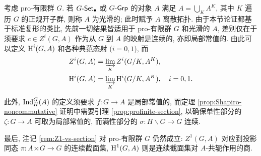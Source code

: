 \begin{remark}\label{rem:pro-finite-coh-nonabelian}
	考虑 pro-有限群 $G$. 若 $G\text{-}\mathsf{Set}_\bullet$ 或 $G\text{-}\mathsf{Grp}$ 的对象 $A$ 满足 $A = \bigcup_K A^K$, 其中 $K$ 遍历 $G$ 的正规开子群, 则称 $A$ 为光滑的; 此时赋予 $A$ 离散拓扑. 由于本节论证都基于标准复形的类比, 先前一切结果皆适用于 pro-有限群 $G$ 和光滑的 $A$, 差别仅在于须要求 $c \in Z^i(G, A)$ 作为从 $G$ 到 $A$ 的映射是连续的, 亦即局部常值的. 由此可以定义 $\operatorname{H}^i(G, A)$ 和各种典范态射 ($i=0,1$), 而
	\begin{align*}
		Z^i(G, A) & = \varinjlim_K Z^i(G/K, A^K), \\
		\operatorname{H}^i(G, A) & = \varinjlim_K \operatorname{H}^i(G/K, A^K), \quad i = 0, 1.
	\end{align*}

	此外, $\operatorname{Ind}^G_H(A)$ 的定义须要求 $f: G \to A$ 是局部常值的, 而定理 \ref{prop:Shapiro-noncommutative} 证明中需要引理 \ref{prop:profinite-section}, 以确保单性部分的 $\zeta: G \to A$ 可取为局部常值的, 而满性部分的 $\sigma: H \backslash G \to G$ 连续.
	
	最后, 注记 \ref{rem:Z1-vs-section} 对 pro-有限群 $G$ 仍然成立: $Z^1(G, A)$ 对应到投影同态 $\pi: A \rtimes G \to G$ 的连续截面集, $\operatorname{H}^1(G, A)$ 则是连续截面集对 $A$-共轭作用的商.
\end{remark}



